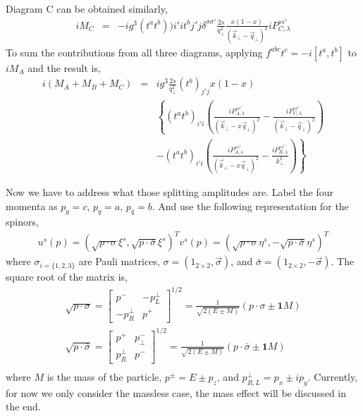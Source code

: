 Diagram C can be obtained similarly,
\begin{eqnarray}
i M_C &=& -i g^3 (t^a t^b)){i'i} t^b{j'j} \delta^{\sigma\sigma'} \frac{2s}{q_\perp^2} \frac{x(1-x)}{(\vec{k}_\perp-\vec{q}_\perp)^2}  iP_{C,\lambda}^{ss'} 
\end{eqnarray}
To sum the contributions from all three diagrams, applying $f^{abc}t^c = -i[t^a, t^b]$ to $iM_A$ and the result is,
\begin{eqnarray}
i (M_A+M_B+M_C) &=& ig^3 \frac{2s}{q_\perp^2} (t^b)_{j'j} x(1-x)\\\nonumber
&&\left\{(t^a t^b)_{i'i} \left(\frac{iP_{A,\lambda}^{ss'} }{(\vec{k}_\perp-x \vec{q}_\perp)^2} - \frac{iP_{C,\lambda}^{ss'}}{(\vec{k}_\perp-\vec{q}_\perp)^2}\right) \right. \\\nonumber
&&\left.-(t^a t^b)_{i'i}\left(\frac{iP_{A,\lambda}^{ss'} }{(\vec{k}_\perp-x \vec{q}_\perp)^2} - \frac{iP_{B,\lambda}^{ss'}}{k_\perp^2}\right) \right\}
\end{eqnarray}

Now we have to address what those splitting amplitudes are.
Label the four momenta as $p_g = c$, $p_q = a$, $p_{\bar{q}} = b$.
And use the following representation for the spinors,
\begin{eqnarray}
u^s(p) = (\sqrt{p\cdot \sigma} \xi^s, \sqrt{p\cdot \bar{\sigma}} \xi^s)^T
v^s(p) = (\sqrt{p\cdot \sigma} \eta^s, -\sqrt{p\cdot \bar{\sigma}} \eta^s)^T
\end{eqnarray}
where $\sigma_{i=\{1,2,3\}}$ are Pauli matrices, $\sigma = (1_{2\times 2}, \vec{\sigma})$, and $\bar{\sigma} = (1_{2\times 2}, -\vec{\sigma})$.
The square root of the matrix is,
\begin{eqnarray}
\sqrt{p\cdot \sigma} =
\left.
\begin{bmatrix}
p^- & -p_L^\perp \\
-p_R^\perp & p^+
\end{bmatrix}\right.^{1/2} 
= \frac{1}{\sqrt{2(E\pm M)}}(p\cdot\sigma \pm \mathbf{1}M)\\
\sqrt{p\cdot \bar{\sigma}} =
\left.
\begin{bmatrix}
p^+ & p_\perp^- \\
p_R^\perp & p^-
\end{bmatrix}\right.^{1/2} 
= \frac{1}{\sqrt{2(E\pm M)}}(p\cdot\bar{\sigma} \pm \mathbf{1}M)\\
\end{eqnarray}
where $M$ is the mass of the particle, $p^\pm = E\pm p_z$, and $p_{R,L}^\perp = p_x \pm  i p_y$.
Currently, for now we only consider the massless case, the mass effect will be discussed in the end.

